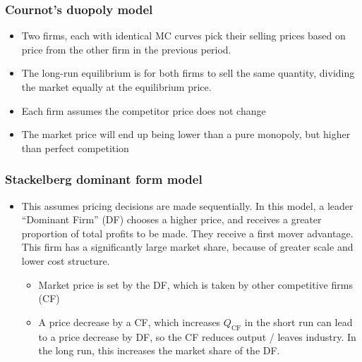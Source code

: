 \documentclass[../notes_compiled.tex]{subfiles}
\begin{document}
\subsubsection{Cournot's duopoly model}
\begin{itemize}
\item Two firms, each with identical MC curves pick their selling prices based on price from the other firm in the previous period. 
\item The long-run equilibrium is for both firms to sell the same quantity, dividing the market equally at the equilibrium price.
\item Each firm assumes the competitor price does not change
\item The market price will end up being lower than a pure monopoly, but higher than perfect competition
\end{itemize}

\subsubsection{Stackelberg dominant form model}
\begin{itemize}
\item This assumes pricing decisions are made sequentially. In this model, a leader ``Dominant Firm'' (DF) chooses a higher price, and receives a greater proportion of total profits to be made. They receive a first mover advantage. This firm has a significantly large market share, because of greater scale and lower cost structure.
\begin{itemize}
\item Market price is set by the DF, which is taken by other competitive firms (CF)
\item A price decrease by a CF, which increases $Q_{\text{CF}}$ in the short run can lead to a price decrease by DF, so the CF reduces output / leaves industry. In the long run, this increases the market share of the DF.
\end{itemize}
\end{itemize}
\end{document}
